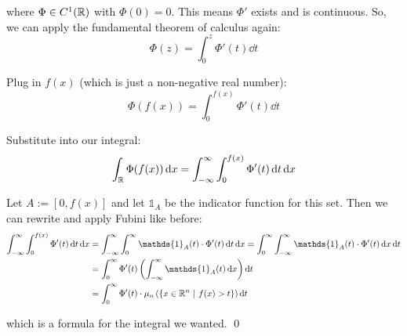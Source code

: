 \documentclass[12pt]{article}
\begin{document}
where $\Phi \in C^1(\mathbb{R})$ with $\Phi(0) = 0$. This means $\Phi'$ exists and is continuous. So, we can apply the fundamental theorem of calculus again:
$$
    \Phi(z) = \int_0^{z} \Phi'(t) \dd t
$$

Plug in $f(x)$ (which is just a non-negative real number):
$$
    \Phi(f(x)) = \int_0^{f(x)} \Phi'(t) \dd t
$$

Substitute into our integral:
$$
    \int_{\mathbb{R}} \Phi(f(x)) \mathop{}\!\mathrm{d} x = \int_{-\infty}^{\infty} \int_0^{f(x)} \Phi'(t) \mathop{}\!\mathrm{d} t \mathop{}\!\mathrm{d} x
$$

Let $A := [0, f(x)]$ and let $\mathds{1}_A$ be the indicator function for this set. Then we can rewrite and apply Fubini like before:
$$
\begin{aligned}
    \int_{-\infty}^{\infty} \int_0^{f(x)} \Phi'(t) \dd t \dd x &= \int_{-\infty}^{\infty} \int_{0}^{\infty} \mathds{1}_A(t) \cdot \Phi'(t) \dd t \dd x = \int_{0}^{\infty} \int_{-\infty}^{\infty} \mathds{1}_A(t) \cdot \Phi'(t) \dd x \dd t \\
    &= \int_{0}^{\infty} \Phi'(t) \left( \int_{-\infty}^{\infty} \mathds{1}_A(t) \dd x \right) \dd t \\
    &= \int_{0}^{\infty} \Phi'(t) \cdot \mu_n\left(\left\{ x \in \R^n \ |\ f(x) > t \right\}\right) \dd t
\end{aligned}
$$

which is a formula for the integral we wanted. \qed
\end{document}
